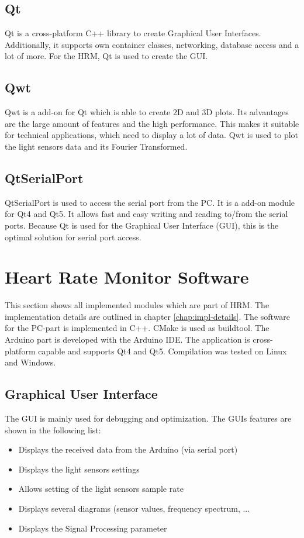 \documentclass[notitlepage]{scrreprt}
\begin{document}
\subsection{Qt}
Qt is a cross-platform C++ library to create Graphical User Interfaces. Additionally, it supports own container classes, networking, database access and a lot of more. For the HRM, Qt is used to create the GUI.

\subsection{Qwt}
Qwt is a add-on for Qt which is able to create 2D and 3D plots. Its advantages are the large amount of features and the high performance. This makes it suitable for technical applications, which need to display a lot of data. Qwt is used to plot the light sensors data and its Fourier Transformed.

\subsection{QtSerialPort}
QtSerialPort is used to access the serial port from the PC. It is a add-on module for Qt4 and Qt5. It allows fast and easy writing and reading to/from the serial ports. Because Qt is used for the Graphical User Interface (GUI), this is the optimal solution for serial port access.

\newpage

\section{Heart Rate Monitor Software}
This section shows all implemented modules which are part of HRM. The implementation details are outlined in chapter \ref{chap:impl-details}. The software for the PC-part is implemented in C++. CMake is used as buildtool. The Arduino part is developed with the Arduino IDE. The application is cross-platform capable and supports Qt4 and Qt5. Compilation was tested on Linux and Windows.

\subsection{Graphical User Interface}
The GUI is mainly used for debugging and optimization. The GUIs features are shown in the following list:

\begin{itemize}
	\item{Displays the received data from the Arduino (via serial port)}
	\item{Displays the light sensors settings}
	\item{Allows setting of the light sensors sample rate}
	\item{Displays several diagrams (sensor values, frequency spectrum, ...}
	\item{Displays the Signal Processing parameter}
\end{itemize}
\end{document}

